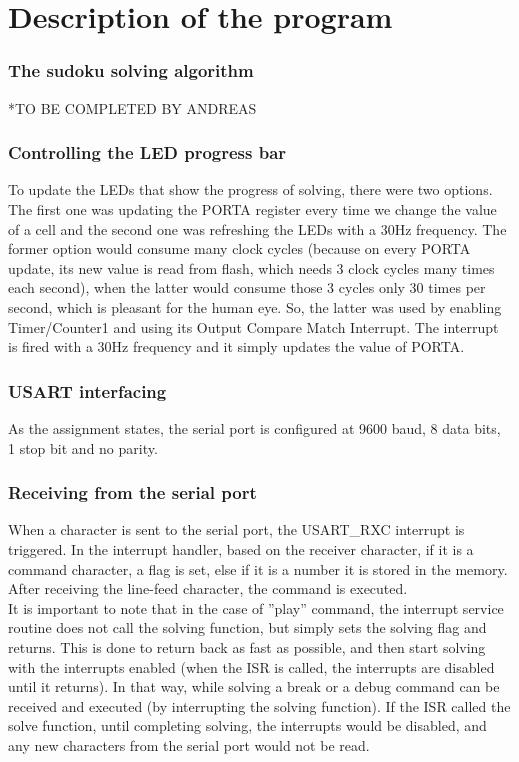 \documentclass[12pt, a4]{article}
\begin{document}
\section*{Description of the program}

\subsubsection*{The sudoku solving algorithm}
*TO BE COMPLETED BY ANDREAS

\subsubsection*{Controlling the LED progress bar}
To update the LEDs that show the progress of solving, there were two options. The first one was updating the PORTA register every time we change the value of a cell and the second one was refreshing the LEDs with a 30Hz frequency. The former option would consume many clock cycles (because on every PORTA update, its new value is read from flash, which needs 3 clock cycles many times each second), when the latter would consume those 3 cycles only 30 times per second, which is pleasant for the human eye. So, the latter was used by enabling Timer/Counter1 and using its Output Compare Match Interrupt. The interrupt is fired with a 30Hz frequency and it simply updates the value of PORTA.

\subsubsection*{USART interfacing}
As the assignment states, the serial port is configured at 9600 baud, 8 data bits, 1 stop bit and no parity.
\subsubsection*{Receiving from the serial port}
When a character is sent to the serial port, the USART\_RXC interrupt is triggered. In the interrupt handler, based on the receiver character, if it is a command character, a flag is set, else if it is a number it is stored in the memory. After receiving the line-feed character, the command is executed. \\
It is important to note that in the case of ''play'' command, the interrupt service routine does not call the solving function, but simply sets the solving flag and returns. This is done to return back as fast as possible, and then start solving with the interrupts enabled (when the ISR is called, the interrupts are disabled until it returns). In that way, while solving a break or a debug command can be received and executed (by interrupting the solving function). If the ISR called the solve function, until completing solving, the interrupts would be disabled, and any new characters from the serial port would not be read.
\end{document}

